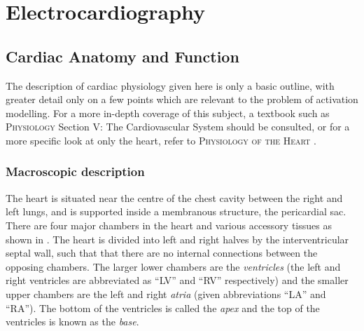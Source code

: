 \chapter{Electrocardiography}

\section{Cardiac Anatomy and Function}

The description of cardiac physiology given here is only a basic outline,
with greater detail only on a few points which are relevant to the problem of
activation modelling.  For a more in-depth coverage of this subject, a
textbook such as \textsc{Physiology} Section V: The Cardiovascular System
\cite{zzz-berne:1988} should be consulted, or for a more specific look
at only the heart, refer to \textsc{Physiology of the Heart}
\cite{katz:1992}.

\subsection{Macroscopic description}

The heart is situated near the centre of the chest cavity between the right
and left lungs, and is supported inside a membranous structure, the
pericardial sac.  There are four major chambers in the heart and various
accessory tissues as shown in .  The heart is
divided into left and right halves by the interventricular septal wall, such
that that there are no internal connections between the opposing chambers.
The larger lower chambers are the \emph{ventricles} (the left and right
ventricles are abbreviated as ``LV'' and ``RV'' respectively) and the smaller
upper chambers are the left and right \emph{atria} (given abbreviations ``LA''
and ``RA'').  The bottom of the ventricles is called the \emph{apex} and the
top of the ventricles is known as the \emph{base}.


